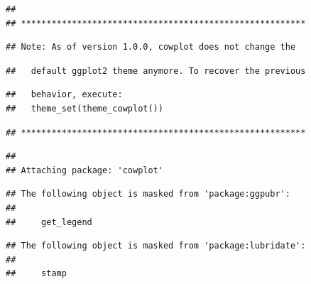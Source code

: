\documentclass[
]{article}
\newenvironment{Shaded}{\begin{snugshade}}{\end{snugshade}}
\newcommand{\CommentTok}[1]{\textcolor[rgb]{0.56,0.35,0.01}{\textit{#1}}}
\newcommand{\KeywordTok}[1]{\textcolor[rgb]{0.13,0.29,0.53}{\textbf{#1}}}
\newcommand{\NormalTok}[1]{#1}
\newcommand{\OperatorTok}[1]{\textcolor[rgb]{0.81,0.36,0.00}{\textbf{#1}}}
\newcommand{\StringTok}[1]{\textcolor[rgb]{0.31,0.60,0.02}{#1}}
\begin{document}
\begin{verbatim}
## 
## ********************************************************
\end{verbatim}

\begin{verbatim}
## Note: As of version 1.0.0, cowplot does not change the
\end{verbatim}

\begin{verbatim}
##   default ggplot2 theme anymore. To recover the previous
\end{verbatim}

\begin{verbatim}
##   behavior, execute:
##   theme_set(theme_cowplot())
\end{verbatim}

\begin{verbatim}
## ********************************************************
\end{verbatim}

\begin{verbatim}
## 
## Attaching package: 'cowplot'
\end{verbatim}

\begin{verbatim}
## The following object is masked from 'package:ggpubr':
## 
##     get_legend
\end{verbatim}

\begin{verbatim}
## The following object is masked from 'package:lubridate':
## 
##     stamp
\end{verbatim}

\begin{Shaded}
\end{Shaded}
\end{document}
